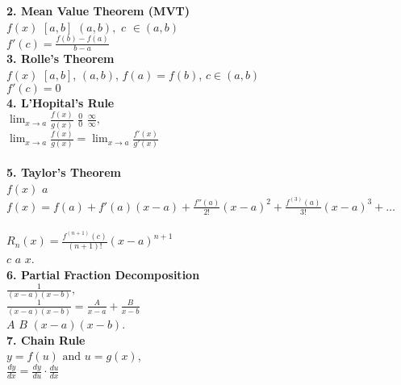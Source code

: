 \documentclass{article}
\begin{document}
\textbf{2. Mean Value Theorem (MVT)} \\
 $f(x)$  $[a, b]$  $(a, b),$  $c$ $\in (a, b)$   \\
$f'(c) = \frac{f(b) - f(a)}{b - a}$  \\

\textbf{3. Rolle's Theorem} \\
 $f(x)$  $[a, b]$,  $(a, b)$,  $f(a) = f(b)$,  $c \in (a, b)$   \\
$f'(c) = 0$  \\

\textbf{4. L'Hopital's Rule} \\
 $\lim_{x \to a} \frac{f(x)}{g(x)}$  $\frac{0}{0}$  $\frac{\infty}{\infty},$   \\
$\lim_{x \to a} \frac{f(x)}{g(x)} = \lim_{x \to a} \frac{f'(x)}{g'(x)}$  \\
  \\

\textbf{5. Taylor's Theorem} \\
 $f(x)$  $a$   \\
$f(x) = f(a) + f'(a)(x - a) + \frac{f''(a)}{2!}(x - a)^2 + \frac{f^{(3)}(a)}{3!}(x - a)^3 + \dots$  \\
  \\
$R_n(x) = \frac{f^{(n+1)}(c)}{(n+1)!}(x - a)^{n+1}$  \\
 $c$  $a$  $x$.  \\

\textbf{6. Partial Fraction Decomposition} \\
 $\frac{1}{(x - a)(x - b)},$   \\
$\frac{1}{(x - a)(x - b)} = \frac{A}{x - a} + \frac{B}{x - b}$  \\
 $A$  $B$  $(x - a)(x - b)$.  \\

\textbf{7. Chain Rule} \\
 $y = f(u) \text{ and } u = g(x)$,   \\
$\frac{dy}{dx} = \frac{dy}{du} \cdot \frac{du}{dx}$  \\
\end{document}
